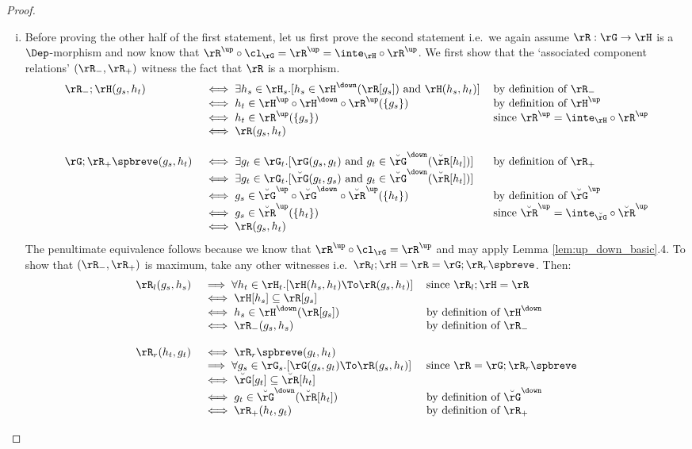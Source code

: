 \documentclass{article}
\begin{document}
\begin{proof}
\begin{enumerate}[i.]
  \item
  Before proving the other half of the first statement, let us first prove the second statement i.e.\ we again assume $\rR : \rG \to \rH$ is a $\Dep$-morphism and now know that $\rR^\up \circ \cl_\rG = \rR^\up = \inte_\rH \circ \rR^\up$. We first show that the `associated component relations' $(\rR_-,\rR_+)$ witness the fact that $\rR$ is a morphism.
  \[
  \begin{tabular}{lll}
  $\rR_- ; \rH(g_s,h_t)$
  & 
  $\iff \exists h_s \in \rH_s.[ h_s \in \rH^\down(\rR[g_s]) \text{ and } \rH(h_s,h_t) ]$
  & by definition of $\rR_-$
  \\&
  $\iff h_t \in \rH^\up \circ \rH^\down \circ \rR^\up(\{g_s\})$
  & by definition of $\rH^\up$
  \\&
  $\iff h_t \in \rR^\up(\{g_s\})$
  & since $\rR^\up = \inte_\rH \circ \rR^\up$
  \\&
  $\iff \rR(g_s,h_t)$
  \\
  \\
  $\rG ; \rR_+\spbreve(g_s,h_t)$
  &
  $\iff \exists g_t \in \rG_t.[ \rG(g_s,g_t) \text{ and } g_t \in \breve{\rG}^\down(\breve{\rR}[h_t])  ]$
  & by definition of $\rR_+$
  \\&
  $\iff \exists g_t \in \rG_t.[ \breve{\rG}(g_t,g_s) \text{ and } g_t \in \breve{\rG}^\down(\breve{\rR}[h_t])  ]$
  \\&
  $\iff g_s \in \breve{\rG}^\up \circ \breve{\rG}^\down \circ \breve{\rR}^\up(\{h_t\})$
  & by definition of $\breve{\rG}^\up$
  \\&
  $\iff g_s \in \breve{\rR}^\up(\{h_t\})$
  & since $\breve{\rR}^\up = \inte_{\breve{\rG}} \circ \breve{\rR}^\up$
  \\&
  $\iff \rR(g_s,h_t)$
  \end{tabular}
  \]
  The penultimate equivalence follows because we know that $\rR^\up \circ \cl_\rG = \rR^\up$ and may apply Lemma \ref{lem:up_down_basic}.4. To show that $(\rR_-,\rR_+)$ is maximum, take any other witnesses i.e.\ $\rR_l ; \rH = \rR = \rG ; \rR_r\spbreve$. Then:
  \[
  \begin{tabular}{lll}
  $\rR_l(g_s,h_s)$
  &
  $\implies \forall h_t \in \rH_t.[ \rH(h_s,h_t) \To \rR(g_s,h_t) ]$
  &
  since $\rR_l ; \rH = \rR$
  \\&
  $\iff \rH[h_s] \subseteq \rR[g_s]$
  \\&
  $\iff h_s \in \rH^\down(\rR[g_s])$
  & by definition of $\rH^\down$
  \\&
  $\iff \rR_-(g_s,h_s)$
  & by definition of $\rR_-$
  \\
  \\
  $\rR_r(h_t,g_t)$
  &
  $\iff \rR_r\spbreve(g_t,h_t)$
  \\&
  $\implies \forall g_s \in \rG_s.[ \rG(g_s,g_t) \To \rR(g_s,h_t) ]$
  & since $\rR = \rG ; \rR_r\spbreve$
  \\&
  $\iff \breve{\rG}[g_t] \subseteq \breve{\rR}[h_t]$
  \\&
  $\iff g_t \in \breve{\rG}^\down (\breve{\rR}[h_t])$
  & by definition of $\breve{\rG}^\down$
  \\&
  $\iff \rR_+(h_t,g_t)$
  & by definition of $\rR_+$
  \end{tabular}
  \]
  

\end{enumerate}
\end{proof}
\end{document}
